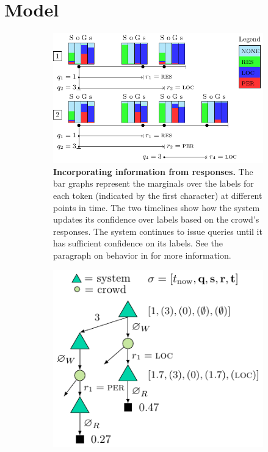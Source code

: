 \section{Model}
\label{sec:model}

\begin{figure}
  \begin{centering}
    \begin{subfigure}[b]{0.58\textwidth}
      \includegraphics[width=\textwidth]{figures/behavior.pdf}
      \caption{
      {\bf Incorporating information from responses.}
      The bar graphs represent the marginals over the labels for each token (indicated by the first character) at different points in time. 
      The two timelines show how the system updates its confidence over labels based on the crowd's responses.
      The system continues to issue queries until it has sufficient confidence on its labels. 
      See the paragraph on behavior in  for more information.
      }
    \end{subfigure}
    \hfill
    \begin{subfigure}[b]{0.38\textwidth}
      \includegraphics[width=\textwidth,height=0.23\textheight,keepaspectratio]{figures/mcts_simple.pdf}\\[1.7ex]

\end{subfigure}
\end{centering}
\end{figure}
